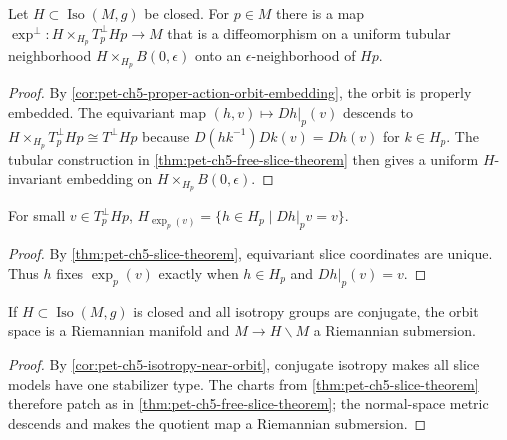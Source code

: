 \begin{theorem}
  \label{thm:pet-ch5-slice-theorem}

  Let $H\subset\operatorname{Iso}(M,g)$ be closed. For $p\in M$ there is a map
  $\exp^\perp:H\times_{H_p}T_p^\perp Hp\to M$ that is a diffeomorphism on a uniform
  tubular neighborhood $H\times_{H_p}B(0,\epsilon)$ onto an $\epsilon$-neighborhood
  of $Hp$.
\end{theorem}
\begin{proof}
  \sketch
  By \cref{cor:pet-ch5-proper-action-orbit-embedding}, the orbit is properly
  embedded. The equivariant map $(h,v)\mapsto Dh|_p(v)$ descends to
  $H\times_{H_p}T_p^\perp Hp\cong T^\perp Hp$ because
  $D(hk^{-1})Dk(v)=Dh(v)$ for $k\in H_p$. The tubular construction in
  \cref{thm:pet-ch5-free-slice-theorem} then gives a uniform $H$-invariant
  embedding on $H\times_{H_p}B(0,\epsilon)$.
\end{proof}

\begin{corollary}
  \label{cor:pet-ch5-isotropy-near-orbit}

  For small $v\in T_p^\perp Hp$, $H_{\exp_p(v)}=\{h\in H_p\mid Dh|_pv=v\}$.
\end{corollary}
\begin{proof}
  \sketch
  By \cref{thm:pet-ch5-slice-theorem}, equivariant slice coordinates are unique.
  Thus $h$ fixes $\exp_p(v)$ exactly when $h\in H_p$ and $Dh|_p(v)=v$.
\end{proof}

\begin{corollary}
  \label{cor:pet-ch5-conjugate-isotropy-manifold}

  If $H\subset\operatorname{Iso}(M,g)$ is closed and all isotropy groups are
  conjugate, the orbit space is a Riemannian manifold and $M\to H\backslash M$ a
  Riemannian submersion.
\end{corollary}
\begin{proof}
  \sketch
  By \cref{cor:pet-ch5-isotropy-near-orbit}, conjugate isotropy makes all slice
  models have one stabilizer type.  The charts from
  \cref{thm:pet-ch5-slice-theorem} therefore patch as in
  \cref{thm:pet-ch5-free-slice-theorem}; the normal-space metric descends and makes
  the quotient map a Riemannian submersion.
\end{proof}

